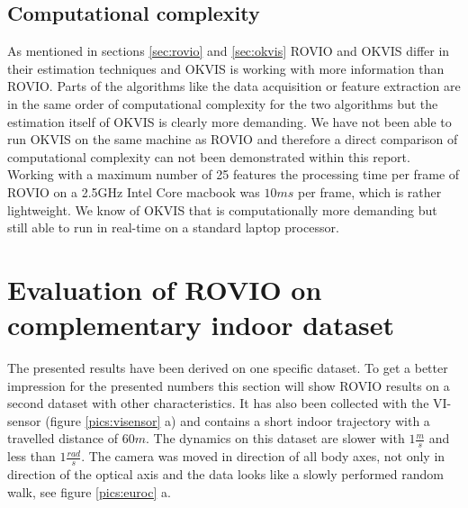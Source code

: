 \subsection{Computational complexity}
\label{sec:ijrr_complexity}

As mentioned in sections \ref{sec:rovio} and \ref{sec:okvis} ROVIO and OKVIS differ in their estimation techniques and OKVIS is working with more information than ROVIO. Parts of the algorithms like the data acquisition or feature extraction are in the same order of computational complexity for the two algorithms but the estimation itself of OKVIS is clearly more demanding. We have not been able to run OKVIS on the same machine as ROVIO and therefore a direct comparison of computational complexity can not been demonstrated within this report. Working with a maximum number of 25 features the processing time per frame of ROVIO on a 2.5GHz Intel Core macbook was $10ms$ per frame, which is rather lightweight. We know of OKVIS that is computationally more demanding but still able to run in real-time on a standard laptop processor.


\section{Evaluation of ROVIO on complementary indoor dataset}
\label{sec:euroc}

The presented results have been derived on one specific dataset. To get a better impression for the presented numbers this section will show ROVIO results on a second dataset with other characteristics. It has also been collected with the VI-sensor (figure \ref{pics:visensor} a) and contains a short indoor trajectory with a travelled distance of $60m$. The dynamics on this dataset are slower with $1\frac{m}{s}$ and less than $1\frac{rad}{s}$. The camera was moved in direction of all body axes, not only in direction of the optical axis and the data looks like a slowly performed random walk, see figure \ref{pics:euroc} a. \\

